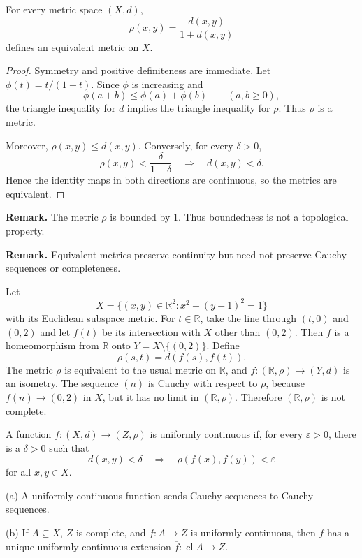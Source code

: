 \begin{thm}
For every metric space $(X,d)$,
\[
\rho(x,y)=\frac{d(x,y)}{1+d(x,y)}
\]
defines an equivalent metric on $X$.
\end{thm}

\begin{proof}
Symmetry and positive definiteness are immediate. Let
$\phi(t)=t/(1+t)$. Since $\phi$ is increasing and
\[
\phi(a+b)\leq\phi(a)+\phi(b)\qquad(a,b\geq0),
\]
the triangle inequality for $d$ implies the triangle inequality for $\rho$.
Thus $\rho$ is a metric.

Moreover, $\rho(x,y)\leq d(x,y)$. Conversely, for every $\delta>0$,
\[
\rho(x,y)<\frac{\delta}{1+\delta}
\quad\Longrightarrow\quad d(x,y)<\delta.
\]
Hence the identity maps in both directions are continuous, so the metrics are
equivalent.
\end{proof}

\textbf{Remark.} The metric $\rho$ is bounded by $1$. Thus boundedness is not
a topological property.

\textbf{Remark.} Equivalent metrics preserve continuity but need not preserve
Cauchy sequences or completeness.

\begin{eg}
Let
\[
X=\{(x,y)\in\mathbb{R}^2:x^2+(y-1)^2=1\}
\]
with its Euclidean subspace metric. For $t\in\mathbb{R}$, take the line
through $(t,0)$ and $(0,2)$ and let $f(t)$ be its intersection with $X$ other
than $(0,2)$. Then $f$ is a homeomorphism from $\mathbb{R}$ onto
$Y=X\setminus\{(0,2)\}$. Define
\[
\rho(s,t)=d(f(s),f(t)).
\]
The metric $\rho$ is equivalent to the usual metric on $\mathbb{R}$, and
$f:(\mathbb{R},\rho)\to(Y,d)$ is an isometry. The sequence $(n)$ is Cauchy
with respect to $\rho$, because $f(n)\to(0,2)$ in $X$, but it has no limit in
$(\mathbb{R},\rho)$. Therefore $(\mathbb{R},\rho)$ is not complete.
\end{eg}

\begin{de}
A function $f:(X,d)\to(Z,\rho)$ is uniformly continuous if, for every
$\varepsilon>0$, there is a $\delta>0$ such that
\[
d(x,y)<\delta\quad\Longrightarrow\quad
\rho(f(x),f(y))<\varepsilon
\]
for all $x,y\in X$.
\end{de}

\begin{thm}
(a) A uniformly continuous function sends Cauchy sequences to Cauchy
sequences.

(b) If $A\subseteq X$, $Z$ is complete, and $f:A\to Z$ is uniformly
continuous, then $f$ has a unique uniformly continuous extension
$\overline f:\operatorname{cl}A\to Z$.
\end{thm}

